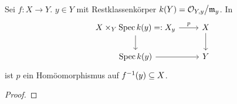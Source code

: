 \begin{lemma}
    Sei $f:X \to Y$. $y\in Y$ mit Restklassenkörper $k(Y) = \mathcal{O}_{Y,y}\big/\mathfrak{m}_y$.
    In
    \[\begin{tikzcd}
        X \times_Y \Spec k(y) =: X_y \rar{p} \dar & X \dar\\
        \Spec k(y) \rar & Y
    \end{tikzcd}\]
    ist $p$ ein Homöomorphismus auf $f^{-1}(y) \subseteq X$.
\end{lemma}
\begin{proof}
    \TODO
\end{proof}



